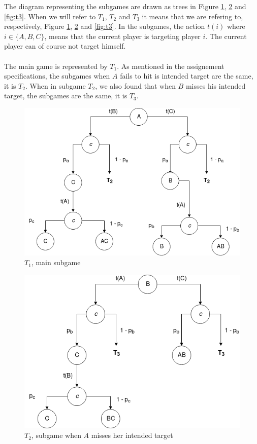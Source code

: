 \documentclass[letterpaper]{article}
\begin{document}
The diagram representing the subgames are drawn as trees in
Figure \ref{fig:t1}, \ref{fig:t2} and \ref{fig:t3}. When we will refer to $T_1$,
$T_2$ and $T_3$ it means that we are refering to, respectively,
Figure \ref{fig:t1}, \ref{fig:t2} and \ref{fig:t3}. In the subgames,
the action $t(i)$ where $i \in \{A, B, C\}$, means that the current player
is targeting player $i$. The current player can of course not target himself.

\paragraph{}

The main game is represented by
$T_1$. As mentioned in the
assignement specifications, the subgames when $A$ fails to hit is intended
target are the same,  it is $T_2$. When in subgame $T_2$, we also found
that when $B$ misses his intended target,
the subgames are the same, it is $T_3$.

\begin{figure}[!ht]
 \centerline{\includegraphics[scale=0.5]{images/T1}}
 \caption{$T_1$, main subgame}
 \label{fig:t1}
\end{figure}

\begin{figure}[!ht]
 \centerline{\includegraphics[scale=0.5]{images/T2}}
 \caption{$T_2$, subgame when $A$ misses her intended target}
 \label{fig:t2}
\end{figure}
\end{document}
